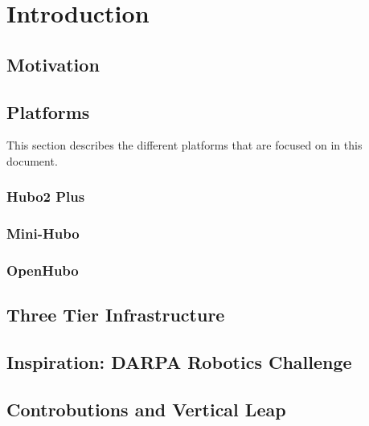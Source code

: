 \chapter{Introduction}
	


	\section{Motivation}\label{sec:roadmap}	
		

	\section{Platforms}
	This section describes the different platforms that are focused on in this document.
		\subsection{Hubo2 Plus}\label{sec:hubo}
			
		\subsection{Mini-Hubo}\label{sec:mini-hubo}
			
		\subsection{OpenHubo}\label{sec:openhubo}
			
		








	\section{Three Tier Infrastructure}\label{sec:threeTier}
		



	\section{Inspiration: DARPA Robotics Challenge}\label{sec:drc}
    		

    	\section{Controbutions and Vertical Leap}
		

